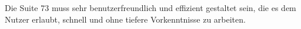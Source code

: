 Die Suite 73 muss sehr benutzerfreundlich und effizient gestaltet sein, die es dem Nutzer erlaubt, schnell und ohne tiefere Vorkenntnisse zu arbeiten.  